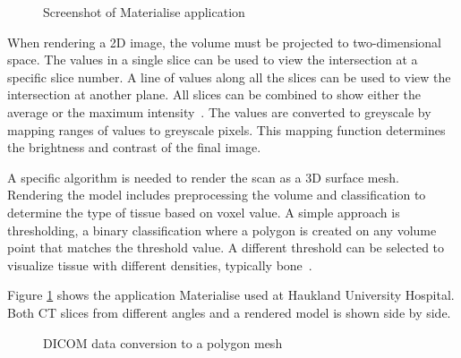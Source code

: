 \documentclass[a4paper]{report}
\begin{document}
\begin{figure}[h!]
    \centering
	\hfill
	\caption{Screenshot of Materialise application \cite{materialise_medical_nodate}}
  \label{mat}
\end{figure}

When rendering a 2D image, the volume must be projected to two-dimensional space. The values in a single slice can be used to view the intersection at a specific slice number. A line of values along all the slices can be used to view the intersection at another plane.
All slices can be combined to show either the average or the maximum intensity~\cite{fishman_volume_2006}.
The values are converted to greyscale by mapping ranges of values to greyscale pixels. This mapping function determines the brightness and contrast of the final image.

A specific algorithm is needed to render the scan as a 3D surface mesh. Rendering the model includes preprocessing the volume and classification to determine the type of tissue based on voxel value. A simple approach is thresholding, a binary classification where a polygon is created on any volume point that matches the threshold value. A different threshold can be selected to visualize tissue with different densities, typically bone~\cite{fishman_volume_2006}.

Figure \ref{mat} shows the application Materialise used at Haukland University Hospital. Both CT slices from different angles and a rendered model is shown side by side.

\begin{figure}[h!]
    \centering
	\hfill
  \caption{DICOM data conversion to a polygon mesh}
  \label{dicom}
\end{figure}
\end{document}
